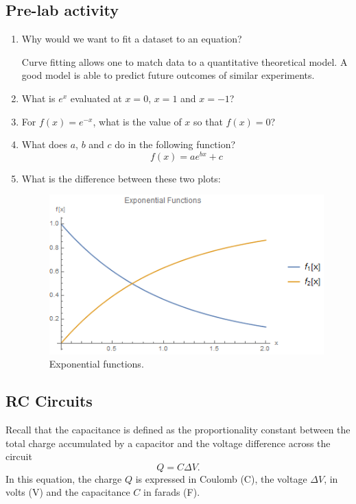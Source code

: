 \documentclass[12pt]{report}
\begin{document}
\subsection{Pre-lab activity}
\begin{enumerate}
\item Why would we want to fit a dataset to an equation?
\begin{tcolorbox}[title=Answer]
Curve fitting allows one to match data to a quantitative theoretical model. A good model is able to predict future outcomes of similar experiments.
\end{tcolorbox}
\item What is $e^{x}$ evaluated at $x=0$, $x=1$ and $x=-1$?
\item For $f(x) = e^{-x}$, what is the value of $x$ so that $f(x)=0$?
\item What does $a$, $b$ and $c$ do in the following function?
\begin{equation}
f(x) = a e^{b x}+c
\end{equation}
\item What is the difference between these two plots:
\begin{figure}[h]
\centering
\includegraphics[width=0.8\linewidth]{lab2-prelab}
\caption{Exponential functions.}
\label{Fig:lab2-prelab}
\end{figure}
\end{enumerate}

\subsection{RC Circuits}
Recall that the capacitance is defined as the proportionality constant between the total charge accumulated by a capacitor and the voltage difference across the circuit
\begin{equation}
Q = C \Delta V.
\end{equation}
In this equation, the charge $Q$ is expressed in Coulomb (C), the voltage $\Delta V$, in volts (V) and the capacitance $C$ in farads (F).
\end{document}
